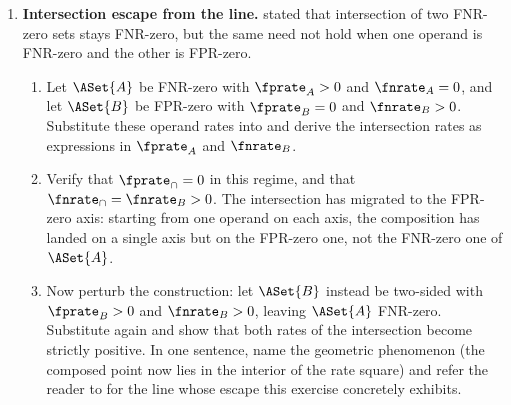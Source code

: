 \begin{enumerate}
\item \exstarstar
\label{ex:ch6-8}
\textbf{Intersection escape from the line.}
 stated that intersection of two FNR-zero
sets stays FNR-zero, but the same need not hold when one operand is
FNR-zero and the other is FPR-zero.
\begin{enumerate}
  \item[(a)] Let $\ASet{A}$ be FNR-zero with $\fprate_A > 0$ and
    $\fnrate_A = 0$, and let $\ASet{B}$ be FPR-zero with
    $\fprate_B = 0$ and $\fnrate_B > 0$. Substitute these operand
    rates into  and derive the
    intersection rates as expressions in $\fprate_A$ and $\fnrate_B$.
  \item[(b)] Verify that $\fprate_\cap = 0$ in this regime, and that
    $\fnrate_\cap = \fnrate_B > 0$. The intersection has migrated to
    the FPR-zero axis: starting from one operand on each axis, the
    composition has landed on a single axis but on the FPR-zero one,
    not the FNR-zero one of $\ASet{A}$.
  \item[(c)] Now perturb the construction: let $\ASet{B}$ instead be
    two-sided with $\fprate_B > 0$ and $\fnrate_B > 0$, leaving
    $\ASet{A}$ FNR-zero. Substitute again and show that both rates
    of the intersection become strictly positive. In one sentence,
    name the geometric phenomenon (the composed point now lies in the
    interior of the rate square) and refer the reader to
     for the line whose escape this
    exercise concretely exhibits.
\end{enumerate}



\end{enumerate}
